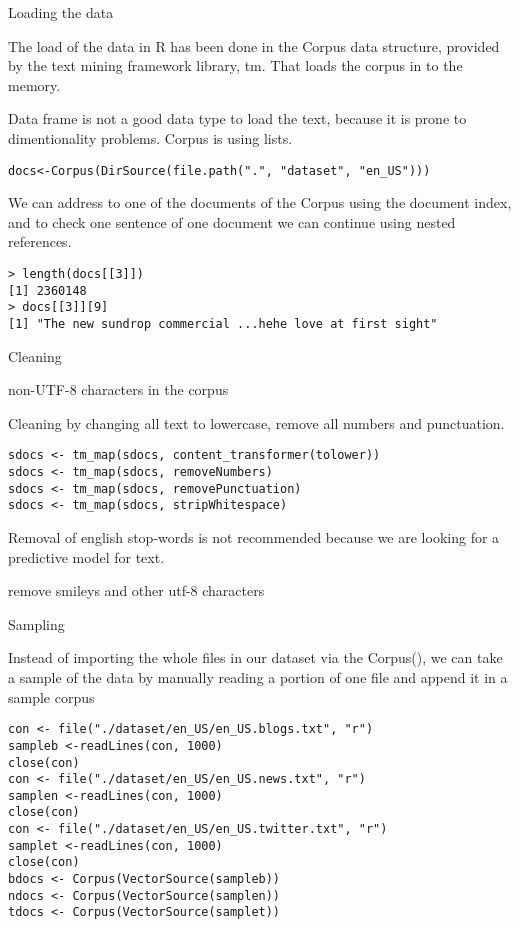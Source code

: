 \documentclass{article}
\begin{document}
Loading the data

The load of the data in R has been done in the Corpus data structure, provided by the text mining framework library, tm. That loads the corpus in to the memory.

Data frame is not a good data type to load the text, because it is prone to dimentionality problems. Corpus is using lists.


\begin{lstlisting}
docs<-Corpus(DirSource(file.path(".", "dataset", "en_US")))
\end{lstlisting}

We can address to one of the documents of the Corpus using the document index, and to check one sentence of one document we can continue using nested references.

\begin{lstlisting}
> length(docs[[3]])
[1] 2360148
> docs[[3]][9]
[1] "The new sundrop commercial ...hehe love at first sight"
\end{lstlisting}


Cleaning

non-UTF-8 characters in the corpus

Cleaning by changing all text to lowercase, remove all numbers and punctuation. 

\begin{lstlisting}
sdocs <- tm_map(sdocs, content_transformer(tolower))
sdocs <- tm_map(sdocs, removeNumbers)
sdocs <- tm_map(sdocs, removePunctuation)
sdocs <- tm_map(sdocs, stripWhitespace)
\end{lstlisting}

Removal of english stop-words is not recommended because we are looking for a predictive model for text.

remove smileys and other utf-8 characters



Sampling

Instead of importing the whole files in our dataset via the Corpus(), we can take a sample of the data by manually reading a portion of one file and append it in a sample corpus 

\begin{lstlisting}
con <- file("./dataset/en_US/en_US.blogs.txt", "r")
sampleb <-readLines(con, 1000)
close(con)
con <- file("./dataset/en_US/en_US.news.txt", "r")
samplen <-readLines(con, 1000)
close(con)
con <- file("./dataset/en_US/en_US.twitter.txt", "r")
samplet <-readLines(con, 1000)
close(con)
bdocs <- Corpus(VectorSource(sampleb))
ndocs <- Corpus(VectorSource(samplen))
tdocs <- Corpus(VectorSource(samplet))
\end{lstlisting}
\end{document}
